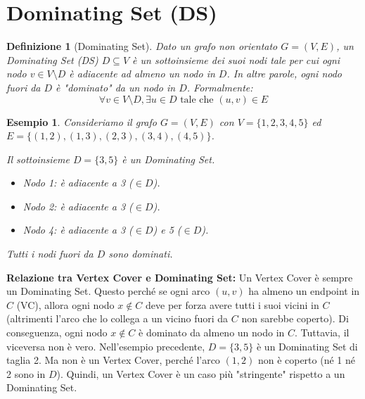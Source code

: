 \documentclass[a4paper, 11pt]{book} %
\newtheorem{definition}[theorem]{Definizione}
\newtheorem{example}[theorem]{Esempio}
\theoremstyle{definition}
\begin{document}
\section{Dominating Set (DS)}

\begin{definition}[Dominating Set]
Dato un grafo non orientato $G=(V, E)$, un \emph{Dominating Set} (DS) $D \subseteq V$ è un sottoinsieme dei suoi nodi tale per cui ogni nodo $v \in V \setminus D$ è adiacente ad almeno un nodo in $D$. In altre parole, ogni nodo fuori da $D$ è "dominato" da un nodo in $D$. Formalmente:
\[ \forall v \in V \setminus D, \exists u \in D \text{ tale che } (u, v) \in E \]
\end{definition}

\begin{example}
Consideriamo il grafo $G=(V, E)$ con $V=\{1,2,3,4,5\}$ ed $E=\{(1,2), (1,3), (2,3), (3,4), (4,5)\}$.
\begin{center}
\end{center}
Il sottoinsieme $D=\{3,5\}$ è un Dominating Set.
\begin{itemize}
    \item Nodo 1: è adiacente a 3 ($\in D$).
    \item Nodo 2: è adiacente a 3 ($\in D$).
    \item Nodo 4: è adiacente a 3 ($\in D$) e 5 ($\in D$).
\end{itemize}
Tutti i nodi fuori da $D$ sono dominati.
\end{example}

\textbf{Relazione tra Vertex Cover e Dominating Set:}
Un Vertex Cover è sempre un Dominating Set. Questo perché se ogni arco $(u,v)$ ha almeno un endpoint in $C$ (VC), allora ogni nodo $x \notin C$ deve per forza avere tutti i suoi vicini in $C$ (altrimenti l'arco che lo collega a un vicino fuori da $C$ non sarebbe coperto). Di conseguenza, ogni nodo $x \notin C$ è dominato da almeno un nodo in $C$.
Tuttavia, il viceversa non è vero. Nell'esempio precedente, $D=\{3,5\}$ è un Dominating Set di taglia 2. Ma non è un Vertex Cover, perché l'arco $(1,2)$ non è coperto (né 1 né 2 sono in $D$).
Quindi, un Vertex Cover è un caso più "stringente" rispetto a un Dominating Set.
\end{document}
